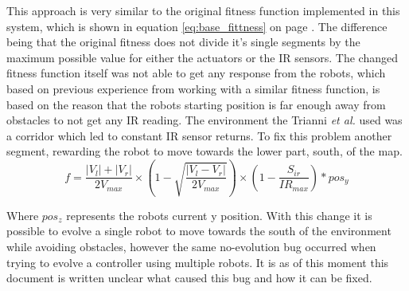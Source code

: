 This approach is very similar to the original fitness function implemented in this system, which is shown in equation \ref{eq:base_fittness} on page \pageref{eq:base_fittness}. The difference being that the original fitness does not divide it's single segments by the maximum possible value for either the actuators or the IR sensors.
The changed fitness function itself was not able to get any response from the robots, which based on previous experience from working with a similar fitness function, is based on the reason that the robots starting position is far enough away from obstacles to not get any IR reading.
The environment the Trianni \textit{et al.} used was a corridor which led to constant IR sensor returns.
To fix this problem another segment, rewarding the robot to move towards the lower part, south, of the map. \\

\begin{equation}
f = \frac{|V_l| + |V_r|}{2V_{max}} \times ( 1 - \sqrt{\frac{|V_l - V_r|}{2V_{max}}}) \times (1 - \frac{S_{ir}}{IR_{max}}) * pos_y
\end{equation}

Where $pos_z$ represents the robots current y position. 
With this change it is possible to evolve a single robot to move towards the south of the environment while avoiding obstacles, however the same no-evolution bug occurred when trying to evolve a controller using multiple robots.
It is as of this moment this document is written unclear what caused this bug and how it can be fixed.  